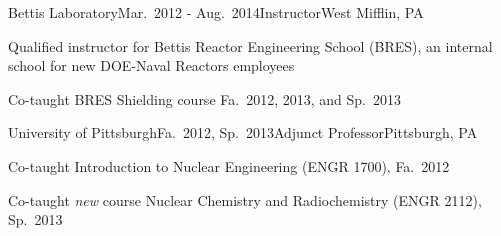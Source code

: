 
\begin{rSubsection}{Bettis Laboratory}{Mar.\ 2012 - Aug.\ 2014}{Instructor}{West Mifflin, PA}
\item Qualified instructor for Bettis Reactor Engineering School (BRES), an internal school for new DOE-Naval Reactors employees
\item Co-taught BRES Shielding course Fa.\ 2012, 2013, and Sp.\ 2013
\end{rSubsection}

\begin{rSubsection}{University of Pittsburgh}{Fa.\ 2012, Sp.\ 2013}{Adjunct Professor}{Pittsburgh, PA}
\item Co-taught Introduction to Nuclear Engineering (ENGR 1700), %
Fa.\ 2012
\item Co-taught \textit{new} course Nuclear Chemistry and Radiochemistry (ENGR
2112), %
Sp.\ 2013
\end{rSubsection}



%
